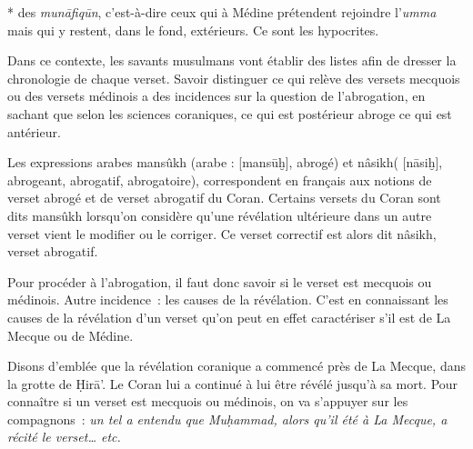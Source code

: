 * des \emph{munāfiqūn}, c'est-à-dire ceux qui à Médine prétendent
rejoindre l'\emph{umma} mais qui y restent, dans le fond, extérieurs. Ce
sont les hypocrites.

Dans ce contexte, les savants musulmans vont établir des listes afin de
dresser la chronologie de chaque verset. Savoir distinguer ce qui relève
des versets mecquois ou des versets médinois a des incidences sur la
question de l'abrogation, en sachant que selon les sciences coraniques,
ce qui est postérieur abroge ce qui est antérieur.
\begin{Def}
\label{mansûkh}
Les expressions arabes mansûkh (arabe :
[mansūḫ], abrogé) et nâsikh( 
[nāsiḫ], abrogeant, abrogatif, abrogatoire), correspondent en français aux notions de verset abrogé et de verset abrogatif du Coran. Certains versets du Coran sont dits mansûkh lorsqu'on considère qu'une révélation ultérieure dans un autre verset vient le modifier ou le corriger. Ce verset correctif est alors dit nâsikh, verset abrogatif.
\end{Def}
Pour procéder à
l'abrogation, il faut donc savoir si le verset est mecquois ou médinois.
Autre incidence~: les causes de la révélation. C'est en connaissant les
causes de la révélation d'un verset qu'on peut en effet caractériser
s'il est de La Mecque ou de Médine.



Disons d'emblée que la révélation coranique a commencé près de La
Mecque, dans la grotte de Ḥirā'. Le Coran lui a continué à lui être
révélé jusqu'à sa mort. Pour connaître si un verset est mecquois ou
médinois, on va s'appuyer sur les compagnons~: \emph{un tel a entendu
que Muḥammad, alors qu'il été à La Mecque, a récité le verset\ldots{}
etc.}

